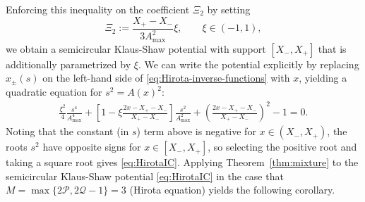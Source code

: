 \documentclass[12pt]{amsart}
\numberwithin{equation}{section}
\newcommand{\tailint}{\Xi}
\begin{document}
Enforcing this inequality on  the coefficient $\tailint_2$ by setting
\begin{equation}
	\tailint_2 := \frac{X_+ - X_-}{3 A_\mathrm{max}^2} \xi, \qquad \xi \in (-1,1),
 \end{equation}
 we obtain a semicircular Klaus-Shaw potential with support $[X_-,X_+]$ that is additionally parametrized by $\xi$. We can write the potential explicitly by replacing $x_\pm(s)$ on the left-hand side of \eqref{eq:Hirota-inverse-functions} with $x$, yielding a quadratic equation for $s^2=A(x)^2$:
\begin{gather}
\frac{\xi^2}{4} \frac{s^4}{A_\mathrm{max}^4} + \left[ 1 - \xi \frac{2x - X_+ - X_-}{X_+ - X_-} \right] \frac{s^2}{A_\mathrm{max}^2} + \left( \frac{2x - X_+ - X_-}{X_+-X_-} \right)^2 - 1 = 0.
\end{gather}
Noting that the constant (in $s$) term above is negative for $x \in (X_-, X_+)$, the roots $s^2$ have opposite signs for $x\in [X_-,X_+]$, so selecting the positive root and taking a square root gives \eqref{eq:HirotaIC}. 
Applying Theorem~\ref{thm:mixture} to the semicircular Klaus-Shaw potential \eqref{eq:HirotaIC} in the case that $M=\max\{2\mathcal{P},2\mathcal{Q}-1\}=3$ (Hirota equation) yields the following corollary.
\end{document}
